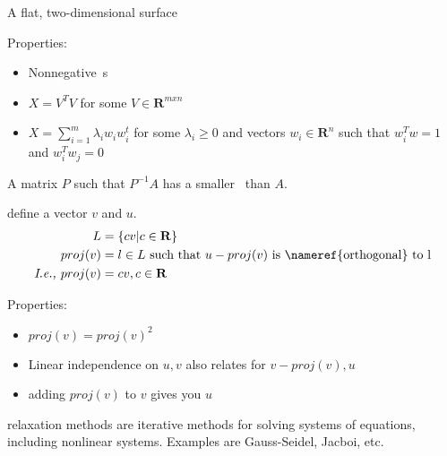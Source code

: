 \begin{definition}[Plane]
    A flat, two-dimensional surface
\end{definition}

\begin{definition}
    Properties:
    \begin{itemize}
        \item Nonnegative~s
        \item $X = V^{T}V$ for some $V \in \mathbf{R}^{mxn}$
        \item $X = \sum\limits_{i=1}^{m}\lambda_{i}w_{i}w^{t}_{i}$ 
            for some $\lambda_{i} \geq 0$ and vectors $w_{i} \in \mathbf{R}^{n}$
            such that $w^{T}_{i}w = 1$ and $w^{T}_{i}w_{j} = 0$

    \end{itemize}
\end{definition}

\begin{definition}[Preconditoner]
    A matrix $P$ such that $P^{-1}A$ has a smaller~
    than $A$.

\end{definition}

\begin{definition}[Projection]
    define a vector $v$ and $u$.
    \begin{align*}
        L &= \left\{cv | c \in \mathbf{R} \right\}  \\
        proj(v) &= l \in L \text{\ such that\ } u - proj(v) 
        \text{\ is~\nameref{orthogonal} to l}  \\
        \textit{I.e., } proj(v) &= cv, c \in \mathbf{R}
    \end{align*}

    Properties:
    \begin{itemize}
        \item $proj(v) = proj(v)^{2}$
        \item Linear independence on $u, v$ also relates for $v - proj(v), u$
        \item adding $proj(v)$ to $v$ gives you $u$
    \end{itemize}

\end{definition}

\begin{definition}
     relaxation methods are iterative methods for solving systems of equations,
     including nonlinear systems. Examples are Gauss-Seidel, Jacboi, etc.

\end{definition}

